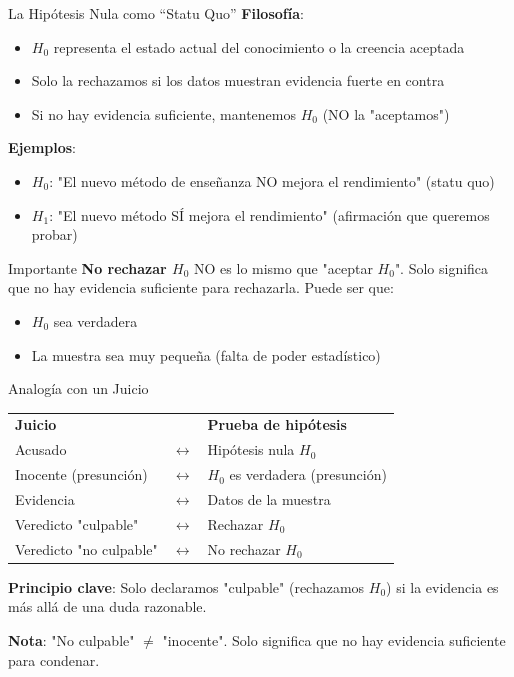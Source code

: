 \documentclass[aspectratio=169, 11pt]{beamer}
\begin{document}
\begin{frame}{La Hipótesis Nula como ``Statu Quo''}
\textbf{Filosofía}:
\begin{itemize}
  \item $H_0$ representa el estado actual del conocimiento o la creencia aceptada
  \item Solo la rechazamos si los datos muestran evidencia \alert{fuerte} en contra
  \item Si no hay evidencia suficiente, mantenemos $H_0$ (NO la "aceptamos")
\end{itemize}

\vspace{0.3cm}
\textbf{Ejemplos}:
\begin{itemize}
  \item $H_0$: "El nuevo método de enseñanza NO mejora el rendimiento" (statu quo)
  \item $H_1$: "El nuevo método SÍ mejora el rendimiento" (afirmación que queremos probar)
\end{itemize}

\vspace{0.3cm}
\begin{alertblock}{Importante}
\textbf{No rechazar $H_0$} NO es lo mismo que "aceptar $H_0$". Solo significa que no hay evidencia suficiente para rechazarla. Puede ser que:
\begin{itemize}
  \item $H_0$ sea verdadera
  \item La muestra sea muy pequeña (falta de poder estadístico)
\end{itemize}
\end{alertblock}
\end{frame}

\begin{frame}{Analogía con un Juicio}
\begin{center}
\begin{tabular}{lcl}
\textbf{Juicio} & & \textbf{Prueba de hipótesis} \\[0.3cm]
Acusado & $\longleftrightarrow$ & Hipótesis nula $H_0$ \\
Inocente (presunción) & $\longleftrightarrow$ & $H_0$ es verdadera (presunción) \\
Evidencia & $\longleftrightarrow$ & Datos de la muestra \\
Veredicto "culpable" & $\longleftrightarrow$ & Rechazar $H_0$ \\
Veredicto "no culpable" & $\longleftrightarrow$ & No rechazar $H_0$ \\
\end{tabular}
\end{center}

\vspace{0.5cm}
\textbf{Principio clave}: Solo declaramos "culpable" (rechazamos $H_0$) si la evidencia es \alert{más allá de una duda razonable}.

\vspace{0.3cm}
\textbf{Nota}: "No culpable" $\neq$ "inocente". Solo significa que no hay evidencia suficiente para condenar.
\end{frame}
\end{document}
